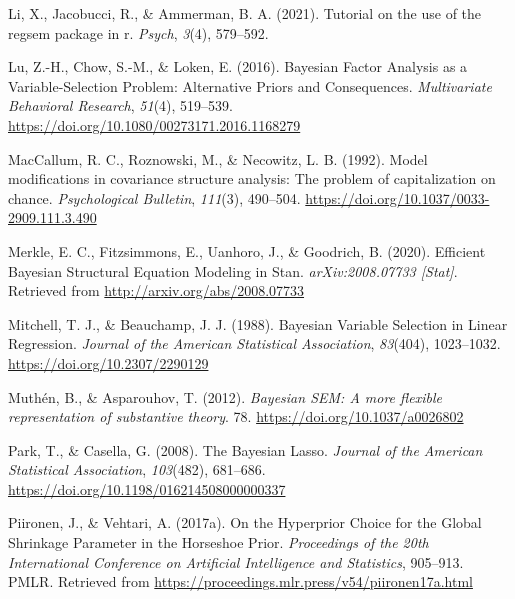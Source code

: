 \documentclass[
  man, donotrepeattitle,floatsintext]{apa6}
\newlength{\cslhangindent}
\newlength{\cslentryspacingunit} %
\newenvironment{CSLReferences}[2] %
 {%
  \setlength{\parindent}{0pt}
  \ifodd #1
  \let\oldpar\par
  \def\par{\hangindent=\cslhangindent\oldpar}
  \fi
  \setlength{\parskip}{#2\cslentryspacingunit}
 }%
 {}
\begin{document}
\begin{CSLReferences}{1}{0}
\leavevmode{}%
Li, X., Jacobucci, R., \& Ammerman, B. A. (2021). Tutorial on the use of the regsem package in r. \emph{Psych}, \emph{3}(4), 579--592.

\leavevmode{}%
Lu, Z.-H., Chow, S.-M., \& Loken, E. (2016). Bayesian {Factor} {Analysis} as a {Variable}-{Selection} {Problem}: {Alternative} {Priors} and {Consequences}. \emph{Multivariate Behavioral Research}, \emph{51}(4), 519--539. \url{https://doi.org/10.1080/00273171.2016.1168279}

\leavevmode{}%
MacCallum, R. C., Roznowski, M., \& Necowitz, L. B. (1992). Model modifications in covariance structure analysis: The problem of capitalization on chance. \emph{Psychological Bulletin}, \emph{111}(3), 490--504. \url{https://doi.org/10.1037/0033-2909.111.3.490}

\leavevmode{}%
Merkle, E. C., Fitzsimmons, E., Uanhoro, J., \& Goodrich, B. (2020). Efficient {Bayesian} {Structural} {Equation} {Modeling} in {Stan}. \emph{arXiv:2008.07733 {[}Stat{]}}. Retrieved from \url{http://arxiv.org/abs/2008.07733}

\leavevmode{}%
Mitchell, T. J., \& Beauchamp, J. J. (1988). Bayesian {Variable} {Selection} in {Linear} {Regression}. \emph{Journal of the American Statistical Association}, \emph{83}(404), 1023--1032. \url{https://doi.org/10.2307/2290129}

\leavevmode{}%
Muthén, B., \& Asparouhov, T. (2012). \emph{Bayesian {SEM}: {A} more ﬂexible representation of substantive theory}. 78. \url{https://doi.org/10.1037/a0026802}

\leavevmode{}%
Park, T., \& Casella, G. (2008). The {Bayesian} {Lasso}. \emph{Journal of the American Statistical Association}, \emph{103}(482), 681--686. \url{https://doi.org/10.1198/016214508000000337}

\leavevmode{}%
Piironen, J., \& Vehtari, A. (2017a). On the {Hyperprior} {Choice} for the {Global} {Shrinkage} {Parameter} in the {Horseshoe} {Prior}. \emph{Proceedings of the 20th {International} {Conference} on {Artificial} {Intelligence} and {Statistics}}, 905--913. PMLR. Retrieved from \url{https://proceedings.mlr.press/v54/piironen17a.html}


\end{CSLReferences}
\end{document}
